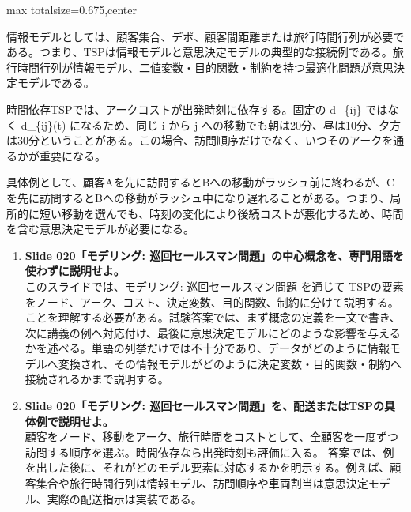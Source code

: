 \begin{adjustbox}{max totalsize={\textwidth}{0.675\textheight},center}
\begin{minipage}{\textwidth}
\begin{minipage}[t]{0.485\textwidth}
情報モデルとしては、顧客集合、デポ、顧客間距離または旅行時間行列が必要である。つまり、TSPは情報モデルと意思決定モデルの典型的な接続例である。旅行時間行列が情報モデル、二値変数・目的関数・制約を持つ最適化問題が意思決定モデルである。\par
時間依存TSPでは、アークコストが出発時刻に依存する。固定の d\_\{ij\} ではなく d\_\{ij\}(t) になるため、同じ i から j への移動でも朝は20分、昼は10分、夕方は30分ということがある。この場合、訪問順序だけでなく、いつそのアークを通るかが重要になる。\par
具体例として、顧客Aを先に訪問するとBへの移動がラッシュ前に終わるが、Cを先に訪問するとBへの移動がラッシュ中になり遅れることがある。つまり、局所的に短い移動を選んでも、時刻の変化により後続コストが悪化するため、時間を含む意思決定モデルが必要になる。\par
{}
\begin{enumerate}
\item \textbf{Slide 020「モデリング: 巡回セールスマン問題」の中心概念を、専門用語を使わずに説明せよ。}\\このスライドでは、モデリング: 巡回セールスマン問題 を通じて TSPの要素をノード、アーク、コスト、決定変数、目的関数、制約に分けて説明する。 ことを理解する必要がある。試験答案では、まず概念の定義を一文で書き、次に講義の例へ対応付け、最後に意思決定モデルにどのような影響を与えるかを述べる。単語の列挙だけでは不十分であり、データがどのように情報モデルへ変換され、その情報モデルがどのように決定変数・目的関数・制約へ接続されるかまで説明する。
\item \textbf{Slide 020「モデリング: 巡回セールスマン問題」を、配送またはTSPの具体例で説明せよ。}\\顧客をノード、移動をアーク、旅行時間をコストとして、全顧客を一度ずつ訪問する順序を選ぶ。時間依存なら出発時刻も評価に入る。 答案では、例を出した後に、それがどのモデル要素に対応するかを明示する。例えば、顧客集合や旅行時間行列は情報モデル、訪問順序や車両割当は意思決定モデル、実際の配送指示は実装である。
\end{enumerate}
\end{minipage}
\end{minipage}
\end{adjustbox}

